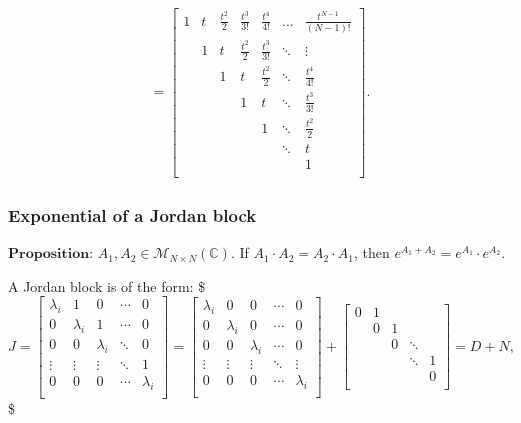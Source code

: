 \documentclass[letterpaper,10pt,english]{jupyterBook}
\begin{document}
\begin{equation*}
\begin{split}
\end{split}
\end{equation*}\begin{equation*}
\begin{split}
    = \left[ {\begin{array}{ccccccc}
    1 & t & \frac{t^2}{2} & \frac{t^3}{3!} & \frac{t^4}{4!} & \dotsc & \frac{t^{N-1}}{(N-1)!}\\
     & 1 & t & \frac{t^2}{2} & \frac{t^3}{3!} & \ddots & \vdots \\
     &  & 1 & t & \frac{t^2}{2} & \ddots & \frac{t^4}{4!}\\
     &  &  & 1 & t & \ddots & \frac{t^3}{3!}\\
     &  &  &  & 1 & \ddots & \frac{t^2}{2} \\
     &  &  &  &  & \ddots & t \\
     &  &  &  &  &  & 1 \\
\end{array} } \right].
\end{split}
\end{equation*}

\subsubsection{Exponential of a Jordan block}
\label{\detokenize{cap3:exponential-of-a-jordan-block}}
\sphinxAtStartPar
\(\textbf{Proposition:}\) \(A_1, A_2 \in \mathscr{M}_{N \times N}(\mathbb{C})\). If \(A_1 \cdot A_2 = A_2 \cdot A_1\), then \(e^{A_1+A_2} = e^{A_1} \cdot e^{A_2}\).

\sphinxAtStartPar
A Jordan block is of the form:
\$\(
J = \left[ {\begin{array}{ccccc}
    \lambda_i & 1 & 0 & \dotsm & 0\\
    0 & \lambda_i & 1 & \dotsm & 0\\
    0 & 0 & \lambda_i & \ddots & 0\\
    \vdots & \vdots & \vdots & \ddots & 1\\
    0 & 0 & 0 & \dotsm & \lambda_i\\
\end{array} } \right] = \left[ {\begin{array}{ccccc}
    \lambda_i & 0 & 0 & \dotsm & 0\\
    0 & \lambda_i & 0 & \dotsm & 0\\
    0 & 0 & \lambda_i & \dotsm & 0\\
    \vdots & \vdots & \vdots & \ddots & \vdots\\
    0 & 0 & 0 & \dotsm & \lambda_i\\
\end{array} } \right] + \left[ {\begin{array}{ccccc}
    0 & 1 &  &  & \\
     & 0 & 1 &  &\\
     &  & 0 & \ddots &\\
     &  &  & \ddots & 1\\
     &  &  &  & 0\\
\end{array} } \right] = D + N,
\)\$
\end{document}
